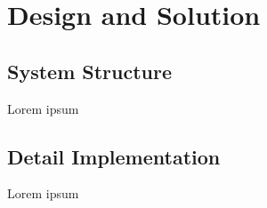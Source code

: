 \chapter{Design and Solution}

\section{System Structure}

Lorem ipsum

\section{Detail Implementation}

Lorem ipsum
